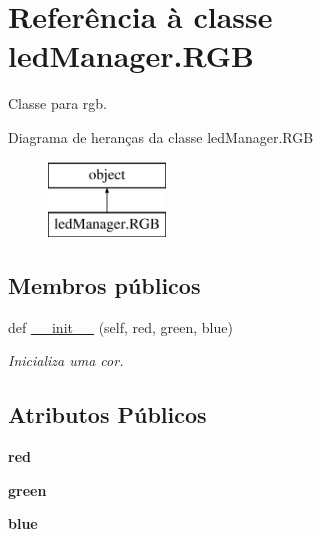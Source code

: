 \hypertarget{classled_manager_1_1_r_g_b}{}\section{Referência à classe led\+Manager.\+R\+GB}
\label{classled_manager_1_1_r_g_b}


Classe para rgb.  


Diagrama de heranças da classe led\+Manager.\+R\+GB\begin{figure}[H]
\begin{center}
\leavevmode
\includegraphics[height=2.000000cm]{classled_manager_1_1_r_g_b}
\end{center}
\end{figure}
\subsection*{Membros públicos}
\begin{DoxyCompactItemize}
\item 
def \hyperlink{classled_manager_1_1_r_g_b_a871e398f9266f95ffa795ae7d7700d53}{\+\_\+\+\_\+init\+\_\+\+\_\+} (self, red, green, blue)
\begin{DoxyCompactList}\small\item\em Inicializa uma cor. \end{DoxyCompactList}\end{DoxyCompactItemize}
\subsection*{Atributos Públicos}
\begin{DoxyCompactItemize}
\item 
{\bfseries red}\hypertarget{classled_manager_1_1_r_g_b_a13d2a549b0d1b8ae4544e5fe161f5ed5}{}\label{classled_manager_1_1_r_g_b_a13d2a549b0d1b8ae4544e5fe161f5ed5}

\item 
{\bfseries green}\hypertarget{classled_manager_1_1_r_g_b_afa5083980155e25e5af80aa4372bbcdc}{}\label{classled_manager_1_1_r_g_b_afa5083980155e25e5af80aa4372bbcdc}

\item 
{\bfseries blue}\hypertarget{classled_manager_1_1_r_g_b_adf44b49c16c2fdfd9aec57ba198422fc}{}\label{classled_manager_1_1_r_g_b_adf44b49c16c2fdfd9aec57ba198422fc}

\end{DoxyCompactItemize}
